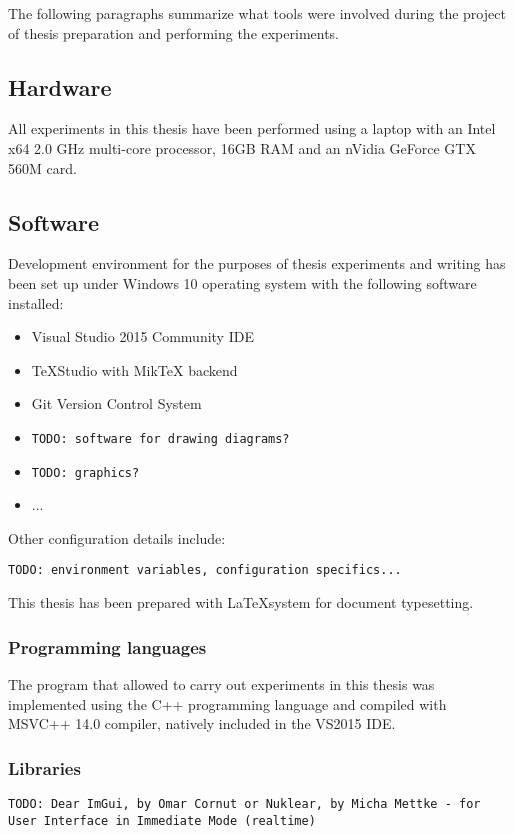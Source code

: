 \documentclass[12pt]{report}
\newcommand{\todo}[1]{}
\renewcommand{\todo}[1]{{\color{red} \par \noindent \footnotesize \texttt{TODO: {#1} }}}
\begin{document}
The following paragraphs summarize what tools were involved during the project of thesis preparation and performing the experiments.

\subsection{Hardware} 

All experiments in this thesis have been performed using a laptop with an Intel x64 2.0 GHz multi-core processor, 16GB RAM and an nVidia GeForce GTX 560M card.
 
\subsection{Software} 

Development environment for the purposes of thesis experiments and writing has been set up under Windows 10 operating system with the following software installed:

\begin{itemize}
	\item Visual Studio 2015 Community IDE
	\item TeXStudio with MikTeX backend
	\item Git Version Control System
	\item \todo{software for drawing diagrams?}
	\item \todo{graphics?}
	\item ...
\end{itemize}

Other configuration details include: \todo{environment variables, configuration specifics...} 

This thesis has been prepared with \LaTeX\space system for document typesetting.

 
\subsubsection{Programming languages} 

The program that allowed to carry out experiments in this thesis was implemented using the C++ programming language and compiled with MSVC++ 14.0 compiler, natively included in the VS2015 IDE.  

\subsubsection{Libraries} 
\todo{Dear ImGui, by Omar Cornut  or Nuklear, by Micha Mettke - for User Interface in Immediate Mode (realtime)}
\end{document}
